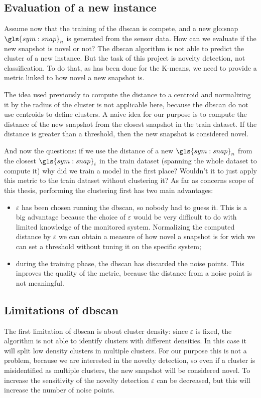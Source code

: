 \subsection{Evaluation of a new instance}
Assume now that the training of the \gls{dbscan} is compete, and a new \gls{glo:snap} $\gls{sym:snap}_n$ is generated from the sensor data. How can we evaluate if the new snapshot is novel or not?
The \gls{dbscan} algorithm is not able to predict the cluster of a new instance. But the task of this project is novelty detection, not classification.
To do that, as has been done for the K-means, we need to provide a metric linked to how novel a new snapshot is. 

The idea used previously to compute the distance to a centroid and normalizing it by the radius of the cluster is not applicable here, because the \gls{dbscan} do not use centroids to define clusters. A naive idea for our purpose is to compute the distance of the new snapshot from the closest snapshot in the train dataset.
If the distance is greater than a threshold, then the new snapshot is considered novel.

And now the questions: if we use the distance of a new $\gls{sym:snap}_n$ from the closest $\gls{sym:snap}_i$ in the train dataset (spanning the whole dataset to compute it) why did we train a model in the first place? Wouldn't it to just apply this metric to the train dataset without clustering it? As far as concerns scope of this thesis, performing the clustering first has two main advantages:
\begin{itemize}
    \item $\varepsilon$ has been chosen running the \gls{dbscan}, so nobody had to guess it. This is a big advantage because the choice of $\varepsilon$ would be very difficult to do with limited knowledge of the monitored system. Normalizing the computed distance by $\varepsilon$ we can obtain a measure of how novel a snapshot is for wich we can set a threshold without tuning it on the specific system;
    \item during the training phase, the \gls{dbscan} has discarded the noise points. This inproves the quality of the metric, because the distance from a noise point is not meaningful.
\end{itemize}

\subsection{Limitations of \gls{dbscan}}
The first limitation of \gls{dbscan} is about cluster density: since $\varepsilon$ is fixed, the algorithm is not able to identify clusters with different densities. In this case it will split low density clusters in multiple clusters. For our purpose this is not a problem, because we are interested in the novelty detection, so even if a cluster is misidentified as multiple clusters, the new snapshot will be considered novel. To increase the sensitivity of the novelty detection $\varepsilon$ can be decreased, but this will increase the number of noise points.

